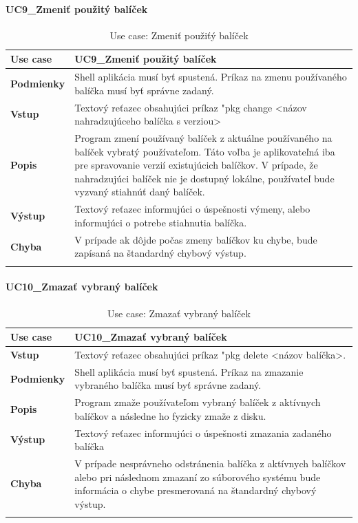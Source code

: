 \paragraph{UC9\_Zmeniť  použitý balíček}
\begin{center}
	\begin{longtable}{|p{2.5cm}|p{12.2cm}|}
		
			\hline
			\textbf{Use case} & UC9\_Zmeniť  použitý balíček \\ 
			\hline
			\textbf{Podmienky} & Shell aplikácia musí byť spustená. Príkaz na zmenu používaného balíčka musí byť správne zadaný.\\ 
			\hline
			\textbf{Vstup} & Textový reťazec obsahujúci príkaz "pkg change  <názov nahradzujúceho balíčka s verziou>\\
			\hline
			\textbf{Popis} & Program zmení používaný balíček z aktuálne používaného na balíček vybratý používateľom. Táto voľba je aplikovateľná iba pre spravovanie verzií existujúcich balíčkov. V prípade, že nahradzujúci balíček nie je dostupný lokálne, používateľ bude vyzvaný stiahnúť daný balíček.\\ 
			\hline
			\textbf{Výstup} & Textový reťazec informujúci o úspešnosti výmeny, alebo informujúci o potrebe stiahnutia balíčka.\\
			\hline
			\textbf{Chyba} & V prípade ak dôjde počas zmeny balíčkov ku chybe, bude zapísaná na štandardný chybový výstup.\\
			\hline
		\caption{Use case: Zmeniť  použiťý balíček}
		\label{table:1}
		
	\end{longtable}
\end{center}

\paragraph{UC10\_Zmazať vybraný balíček}
\begin{center}
	\begin{longtable}{|p{2.5cm}|p{12.2cm}|}
		
			\hline
			\textbf{Use case} & UC10\_Zmazať vybraný balíček \\ 
			\hline
			\textbf{Vstup} & Textový reťazec obsahujúci príkaz "pkg delete <názov balíčka>.\\
			\hline
			\textbf{Podmienky} & Shell aplikácia musí byť spustená. Príkaz na zmazanie vybraného balíčka musí byť správne zadaný.\\ 
			\hline
			\textbf{Popis} & Program zmaže používateľom vybraný balíček z aktívnych balíčkov a následne ho fyzicky zmaže z disku. \\
			\hline

			\textbf{Výstup} & Textový reťazec informujúci o úspešnosti zmazania zadaného balíčka\\
			\hline
			\textbf{Chyba} & V prípade nesprávneho odstránenia balíčka z aktívnych balíčkov alebo pri následnom zmazaní zo súborového systému bude informácia o chybe presmerovaná na štandardný chybový výstup.\\
			\hline
		\caption{Use case: Zmazať vybraný balíček}
		\label{table:1}
		
	\end{longtable}
\end{center}
